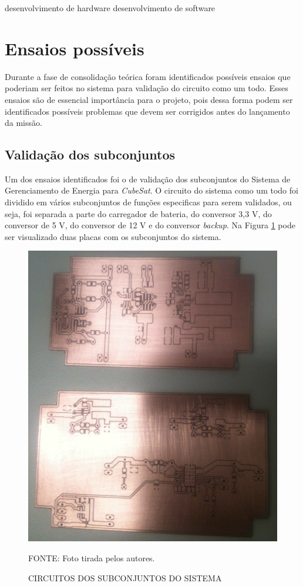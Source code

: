 \documentclass[
	12pt,				%
	openright,			%
	oneside,			%
	a4paper,			%
	english,			%
	french,				%
	spanish,			%
	brazil,				%
	oldfontcommands
	]{abntex2}
\begin{document}
desenvolvimento de hardware
desenvolvimento de software

\section[Ensaios possíveis]{Ensaios possíveis}
	
	Durante a fase de consolidação teórica foram identificados possíveis ensaios que poderiam ser feitos no sistema para validação do circuito como um todo. Esses ensaios são de essencial importância para o projeto, pois dessa forma podem ser identificados possíveis problemas que devem ser corrigidos antes do lançamento da missão.
	
\subsection[Validação dos subconjuntos]{Validação dos subconjuntos}

	Um dos ensaios identificados foi o de validação dos subconjuntos do Sistema de Gerenciamento de Energia para \textit{CubeSat}. O circuito do sistema como um todo foi dividido em vários subconjuntos de funções especificas para serem validados, ou seja, foi separada a parte do carregador de bateria, do conversor 3,3 V, do conversor de 5 V, do conversor de 12 V e do conversor \textit{backup}. Na Figura \ref{Fig_SubConj} pode ser visualizado duas placas com os subconjuntos do sistema.
	
	\begin{figure}[th]
		\caption{CIRCUITOS DOS SUBCONJUNTOS DO SISTEMA}
		\label{Fig_SubConj}
		\centering
		\includegraphics[width=0.7\linewidth]{./figs/placas_subconjuntos}
			
		\begin{small}
			FONTE: Foto tirada pelos autores.
		\end{small}		
	\end{figure}
	
\end{document}
